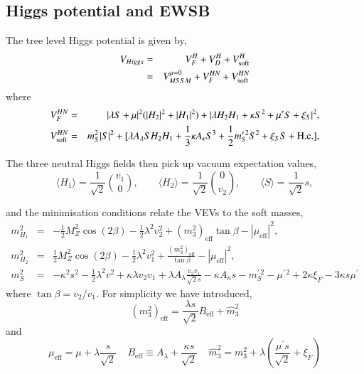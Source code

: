 \documentclass[final,3p,times,pdflatex]{elsarticle}
\newcommand{\be}{\begin{equation}}
\newcommand{\ee}{\end{equation}}
\newcommand{\ba}{\begin{eqnarray}}
\newcommand{\ea}{\end{eqnarray}}
\newcommand{\ds}{\displaystyle}
\begin{document}
\subsection{Higgs potential and EWSB\label{sec:hpot}}
The tree level Higgs potential is given by,
\ba V_{Higgs} & = & V^H_F + V^H_D + V_{\rm soft}^H  \\
            & = & V^{\mu=0}_{MSSM} + V^{HN}_{F} + V_{\rm soft}^{HN}\ea where 
\ba  V^{HN}_{F} & = &  |\lambda S + \mu|^2 (|H_2|^2+|H_1|^2) + |\lambda H_2H_1
+\kappa S^2 + \mu^\prime S + \xi_S|^2  , \label{eq:HpotF} \\
 V_{\rm soft}^{HN}  & = &  m_S^2|S|^2
+ [\lambda A_{\lambda}SH_2H_1+\frac{1}{3}\kappa A_{\kappa}S^3+ \ds\frac{1}{2}m_S^{\prime \, 2} S^2 + \xi_S S + \textrm{H.c.} ], 
\label{eq:HpotS} \ea

The three neutral Higgs fields then pick up vacuum expectation values,  
\be 
        \langle H_1 \rangle = \ds\frac{1}{\sqrt{2}}{v_1 \choose 0}, 
\qquad  \langle H_2 \rangle = \ds\frac{1}{\sqrt{2}}{0 \choose v_2}, 
\qquad  \langle S \rangle =  \ds\frac{1}{\sqrt{2}}s, \label{eq:potmin} \ee
  
\noindent and the minimisation conditions relate the VEVs to the soft masses,
\ba m_{H_1}^2&=& -\frac{1}{2}M_Z^2 \cos(2\beta) - \ds\frac{1}{2}\lambda^2 v_2^2
 + (m_3^2)_\textrm{eff} \tan\beta 
- |\mu_\textrm{eff}|^2, \label{eq:mind}\\
m_{H_2}^2&=& \frac{1}{2}M_Z^2 \cos(2\beta) - \ds\frac{1}{2}\lambda^2 v_1^2 
+  \frac{(m_3^2)_\textrm{eff}}{\tan\beta} 
- |\mu_\textrm{eff}|^2 , \label{eq:minu} \\
m_S^2 &=& -\kappa^2 s^2 - \ds\frac{1}{2}\lambda^2v^2 + \kappa\lambda v_2v_1
+ \lambda A_{\lambda} \frac{v_2v_1}{\sqrt{2}s}
-\kappa A_{\kappa}s  - m^{\prime \,2}_S - \mu^{\prime \,2} + 2 \kappa \xi_F  - 3 \kappa s \mu^\prime \label{eq:mins}
\ea where $\tan \beta = v_2 /  v_1$. %
For simplicity we have introduced,
\be (m_3^2)_\textrm{eff} = \ds\frac{ \lambda s}{\sqrt{2}} B_\textrm{eff} + \widehat{m}_3^2 \ee and
\be  \mu_\textrm{eff} = \mu + \lambda \frac{s}{\sqrt{2}} \;\;\;\; B_\textrm{eff}\equiv A_\lambda+\ds\frac{\kappa s}{\sqrt{2}} \;\;\;\; \widehat{m}_3^2 = m_3^2 + \lambda (\ds\frac{\mu^\prime s}{\sqrt{2}} + \xi_F) \ee
\end{document}
